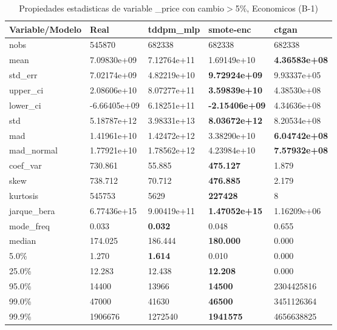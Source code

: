 \begin{table}[H]
\centering
\fontsize{8}{14}\selectfont
\caption{Propiedades estadisticas de variable \_price con cambio\ensuremath{>}5\%, Economicos (B-1)}
\label{table-stats-economicos-b-1-_price-short}
\begin{tabular}{|l|m{10em}|m{10em}|m{10em}|m{10em}|}
\hline
 \rowcolor[gray]{0.8}
Variable/Modelo & Real & tddpm\_mlp & smote-enc & ctgan \\
\hline nobs & 545870 & 682338 & 682338 & 682338 \\
\hline mean & 7.09830e+09 & \cellcolor[rgb]{0.9, 0.54, 0.52} 7.12764e+11 & 1.69149e+10 & \bfseries 4.36583e+08 \\
\hline std\_err & 7.02174e+09 & \cellcolor[rgb]{0.9, 0.54, 0.52} 4.82219e+10 & \bfseries 9.72924e+09 & 9.93337e+05 \\
\hline upper\_ci & 2.08606e+10 & \cellcolor[rgb]{0.9, 0.54, 0.52} 8.07277e+11 & \bfseries 3.59839e+10 & 4.38530e+08 \\
\hline lower\_ci & -6.66405e+09 & \cellcolor[rgb]{0.9, 0.54, 0.52} 6.18251e+11 & \bfseries -2.15406e+09 & 4.34636e+08 \\
\hline std & 5.18787e+12 & \cellcolor[rgb]{0.9, 0.54, 0.52} 3.98331e+13 & \bfseries 8.03672e+12 & 8.20534e+08 \\
\hline mad & 1.41961e+10 & \cellcolor[rgb]{0.9, 0.54, 0.52} 1.42472e+12 & 3.38290e+10 & \bfseries 6.04742e+08 \\
\hline mad\_normal & 1.77921e+10 & \cellcolor[rgb]{0.9, 0.54, 0.52} 1.78562e+12 & 4.23984e+10 & \bfseries 7.57932e+08 \\
\hline coef\_var & 730.861 & 55.885 & \bfseries 475.127 & \cellcolor[rgb]{0.9, 0.54, 0.52} 1.879 \\
\hline skew & 738.712 & 70.712 & \bfseries 476.885 & \cellcolor[rgb]{0.9, 0.54, 0.52} 2.179 \\
\hline kurtosis & 545753 & 5629 & \bfseries 227428 & \cellcolor[rgb]{0.9, 0.54, 0.52} 8 \\
\hline jarque\_bera & 6.77436e+15 & 9.00419e+11 & \bfseries 1.47052e+15 & \cellcolor[rgb]{0.9, 0.54, 0.52} 1.16209e+06 \\
\hline mode\_freq & 0.033 & \bfseries 0.032 & 0.048 & \cellcolor[rgb]{0.9, 0.54, 0.52} 0.655 \\
\hline median & 174.025 & 186.444 & \bfseries 180.000 & \cellcolor[rgb]{0.9, 0.54, 0.52} 0.000 \\
\hline 5.0\% & 1.270 & \bfseries 1.614 & 0.010 & \cellcolor[rgb]{0.9, 0.54, 0.52} 0.000 \\
\hline 25.0\% & 12.283 & 12.438 & \bfseries 12.208 & \cellcolor[rgb]{0.9, 0.54, 0.52} 0.000 \\
\hline 95.0\% & 14400 & 13966 & \bfseries 14500 & \cellcolor[rgb]{0.9, 0.54, 0.52} 2304425816 \\
\hline 99.0\% & 47000 & 41630 & \bfseries 46500 & \cellcolor[rgb]{0.9, 0.54, 0.52} 3451126364 \\
\hline 99.9\% & 1906676 & 1272540 & \bfseries 1941575 & \cellcolor[rgb]{0.9, 0.54, 0.52} 4656638825 \\
\hline
\end{tabular}
\end{table}
